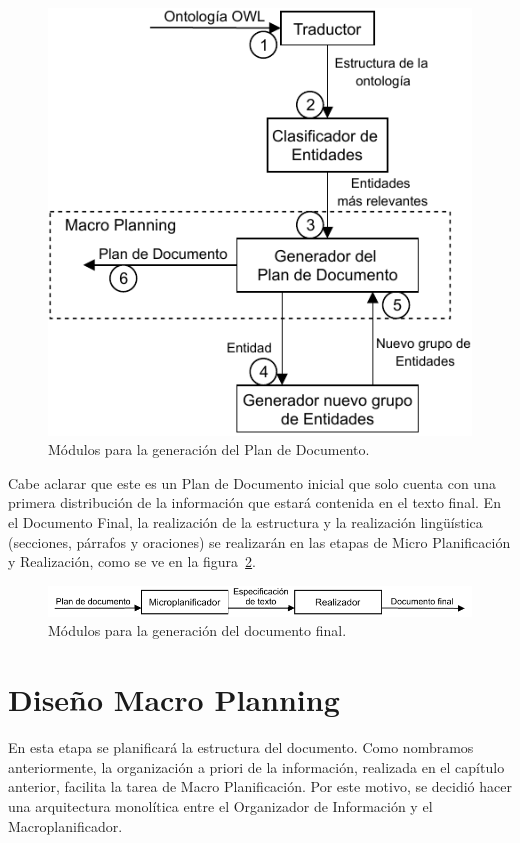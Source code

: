 \begin{figure}[H]
    \centering
    \includegraphics{img/generacion_documento/modulos_plan_documento.pdf}
    \caption{Módulos para la generación del Plan de Documento.}
    \label{fig:modulos_plan_documento}
\end{figure}

Cabe aclarar que este es un Plan de Documento inicial que solo cuenta con una primera distribución de la información que estará contenida en el texto final. En el Documento Final, la realización de la estructura y la realización lingüística (secciones, párrafos y oraciones) se realizarán en las etapas de Micro Planificación y Realización, como se ve en la figura~\ref{fig:modulos_documento_final}.

\begin{figure}[H]
    \centering
    \includegraphics[width=12cm]{img/generacion_documento/modulos_documento_final.pdf}
    \caption{Módulos para la generación del documento final.}
    \label{fig:modulos_documento_final}
\end{figure}

\section{Diseño Macro Planning}
\label{sec:macro_planning}
En esta etapa se planificará la estructura del documento. Como nombramos anteriormente, la organización a priori de la información, realizada en el capítulo anterior, facilita la tarea de Macro Planificación. Por este motivo, se decidió hacer una arquitectura monolítica entre el Organizador de Información y el Macroplanificador. 

